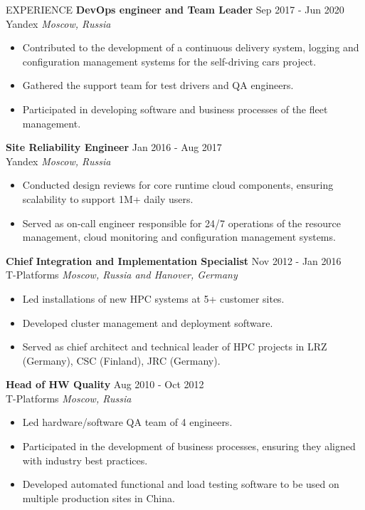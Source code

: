 \documentclass{resume} %
\begin{document}
\begin{rSection}{EXPERIENCE}
\textbf{DevOps engineer and Team Leader} \hfill Sep 2017 - Jun 2020\\
Yandex \hfill \textit{Moscow, Russia}
\begin{itemize}
   \itemsep -3pt {}
   \item Contributed to the development of a continuous delivery system, logging and configuration management systems for the self-driving cars project.
   \item Gathered the support team for test drivers and QA engineers.
   \item Participated in developing software and business processes of the fleet management.
\end{itemize}

\textbf{Site Reliability Engineer} \hfill Jan 2016 - Aug 2017\\
Yandex \hfill \textit{Moscow, Russia}
\begin{itemize}
   \itemsep -3pt {}
   \item Conducted design reviews for core runtime cloud components, ensuring scalability to support 1M+ daily users.
   \item Served as on-call engineer responsible for 24/7 operations of the resource management, cloud monitoring and configuration management systems.
\end{itemize}

\pagebreak
\textbf{Chief Integration and Implementation Specialist} \hfill Nov 2012 - Jan 2016\\
T-Platforms \hfill \textit{Moscow, Russia and Hanover, Germany}
\begin{itemize}
   \itemsep -3pt {}
   \item Led installations of new HPC systems at 5+ customer sites.
   \item Developed cluster management and deployment software.
   \item Served as chief architect and technical leader of HPC projects in LRZ (Germany), CSC (Finland), JRC (Germany).
\end{itemize}

\textbf{Head of HW Quality} \hfill Aug 2010 - Oct 2012\\
T-Platforms \hfill \textit{Moscow, Russia}
\begin{itemize}
   \itemsep -3pt {}
   \item Led hardware/software QA team of 4 engineers.
   \item Participated in the development of business processes, ensuring they aligned with industry best practices.
   \item Developed automated functional and load testing software to be used on multiple production sites in China.
\end{itemize}


\end{rSection}
\end{document}
